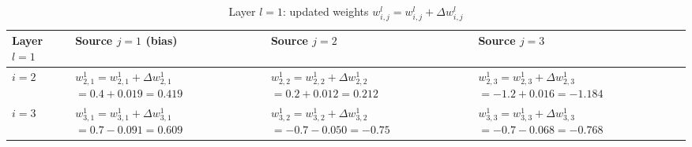 \begin{table}[h!]
    \centering
    \begin{tabular}{|m{1.25cm}|p{4cm}|p{4cm}|p{4cm}|}
        \hline
        \centering Layer $l = 1$ &
        \centering Source $j = 1$ (bias) &
        Source $j = 2$ &
        Source $j = 3$ \\
        \hline
        \centering $i = 2$ &
        $w_{2, 1}^1 = w_{2, 1}^1 + \Delta w_{2, 1}^1$
        $= 0.4 + 0.019 = 0.419$ &
        $w_{2, 2}^1 = w_{2, 2}^1 + \Delta w_{2, 2}^1$
        $= 0.2 + 0.012 = 0.212$ &
        $w_{2, 3}^1 = w_{2, 3}^1 + \Delta w_{2, 3}^1$
        $= -1.2 + 0.016 = -1.184$ \\
        \hline
        \centering $i = 3$ &
        $w_{3, 1}^1 = w_{3, 1}^1 + \Delta w_{3, 1}^1$
        $= 0.7 - 0.091 = 0.609$ &
        $w_{3, 2}^1 = w_{3, 2}^1 + \Delta w_{3, 2}^1$
        $= -0.7 - 0.050 = -0.75$ &
        $w_{3, 3}^1 = w_{3, 3}^1 + \Delta w_{3, 3}^1$
        $= -0.7 - 0.068 = -0.768$ \\
        \hline
    \end{tabular}
\caption{Layer $l = 1$: updated weights $w_{i, j}^l = w_{i, j}^l + \Delta w_{i, j}^l$}
\label{table:layer1-updated-weights}
\end{table}
